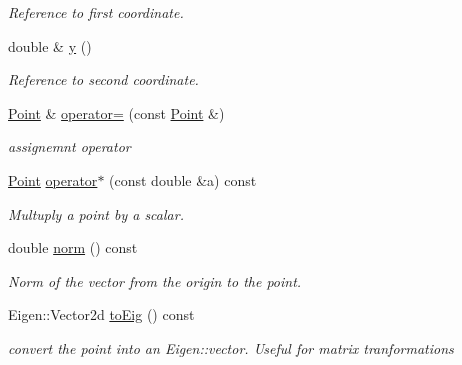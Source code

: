 \begin{DoxyCompactItemize}
\begin{DoxyCompactList}\small\item\em Reference to first coordinate. \end{DoxyCompactList}\item 
double \& \hyperlink{classTspeed_1_1Geo_1_1Point_a77ed4b94b0f211f9f8b9a561303f0a32}{y} ()
\begin{DoxyCompactList}\small\item\em Reference to second coordinate. \end{DoxyCompactList}\item 
\hyperlink{classTspeed_1_1Geo_1_1Point}{Point} \& \hyperlink{classTspeed_1_1Geo_1_1Point_aa1ac2e8afe8a77f5e13872a8fd362351}{operator=} (const \hyperlink{classTspeed_1_1Geo_1_1Point}{Point} \&)
\begin{DoxyCompactList}\small\item\em assignemnt operator \end{DoxyCompactList}\item 
\hyperlink{classTspeed_1_1Geo_1_1Point}{Point} \hyperlink{classTspeed_1_1Geo_1_1Point_a1f311acf13032407ae28d323883e6aa1}{operator$\ast$} (const double \&a) const 
\begin{DoxyCompactList}\small\item\em Multuply a point by a scalar. \end{DoxyCompactList}\item 
double \hyperlink{classTspeed_1_1Geo_1_1Point_a38c11bbd4d5e6db5f0486e8de30e6ca9}{norm} () const 
\begin{DoxyCompactList}\small\item\em Norm of the vector from the origin to the point. \end{DoxyCompactList}\item 
Eigen\-::\-Vector2d \hyperlink{classTspeed_1_1Geo_1_1Point_a4a3f7bd060f187b20cc258c47bf89da9}{to\-Eig} () const 
\begin{DoxyCompactList}\small\item\em convert the point into an Eigen\-::vector. Useful for matrix tranformations \end{DoxyCompactList}\end{DoxyCompactItemize}
